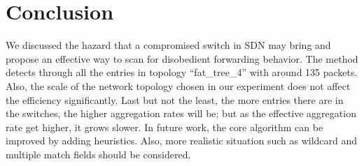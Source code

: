 \documentclass[conference]{IEEEtran}
\begin{document}
\section{Conclusion}
\label{conclusion}
We discussed the hazard that a compromised switch in SDN may bring and propose an effective way to scan  for disobedient forwarding behavior. The method detects through all the entries in topology ``fat\_tree\_4'' with around 135 packets. Also, the scale of the network topology chosen in our experiment does not affect the efficiency significantly. Last but not the least, the more entries there are in the switches, the higher aggregation rates will be; but as the effective aggregation rate get higher, it grows slower. In future work, the core algorithm can be improved by adding heuristics. Also, more realistic situation such as wildcard and multiple match fields should be considered.





\end{document}
